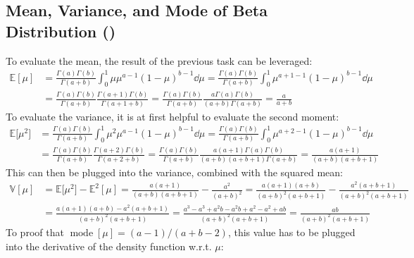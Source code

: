 \documentclass[11pt, a4paper]{scrartcl}
\newcommand{\E}{\mathbb{E}}
\newcommand{\Var}{\mathbb{V}}
\DeclareMathOperator{\mode}{mode}
\newcommand{\diffstar}{\texorpdfstring{\raisebox{-1pt}{\resizebox{!}{8pt}{\(\star\)}}}{*}}
\newcommand{\onestar}  {(\diffstar)}
\begin{document}
		\subsection{Mean, Variance, and Mode of Beta Distribution  \onestar}
			To evaluate the mean, the result of the previous task can be leveraged:
			\begin{align}
				\E[\mu]
					&= \frac{\Gamma(a) \Gamma(b)}{\Gamma(a + b)} \int_{0}^{1}\! \mu \mu^{a - 1} (1 - \mu)^{b - 1} \dd{\mu}
					 = \frac{\Gamma(a) \Gamma(b)}{\Gamma(a + b)} \int_{0}^{1}\! \mu^{a + 1 - 1} (1 - \mu)^{b - 1} \dd{\mu} \\
					&= \frac{\Gamma(a) \Gamma(b)}{\Gamma(a + b)} \frac{\Gamma(a + 1) \Gamma(b)}{\Gamma(a + 1 + b)}
					 = \frac{\Gamma(a) \Gamma(b)}{\Gamma(a + b)} \frac{a \Gamma(a) \Gamma(b)}{(a + b) \Gamma(a + b)}
					 = \frac{a}{a + b}
			\end{align}
			To evaluate the variance, it is at first helpful to evaluate the second moment:
			\begin{align}
				\E\big[\mu^2\big]
					&= \frac{\Gamma(a) \Gamma(b)}{\Gamma(a + b)} \int_{0}^{1}\! \mu^2 \mu^{a - 1} (1 - \mu)^{b - 1} \dd{\mu}
					 = \frac{\Gamma(a) \Gamma(b)}{\Gamma(a + b)} \int_{0}^{1}\! \mu^{a + 2 - 1} (1 - \mu)^{b - 1} \dd{\mu} \\
					&= \frac{\Gamma(a) \Gamma(b)}{\Gamma(a + b)} \frac{\Gamma(a + 2) \Gamma(b)}{\Gamma(a + 2 + b)}
					 = \frac{\Gamma(a) \Gamma(b)}{\Gamma(a + b)} \frac{a (a + 1) \Gamma(a) \Gamma(b)}{(a + b) (a + b + 1) \Gamma(a + b)}
					 = \frac{a (a + 1)}{(a + b) (a + b + 1)}
			\end{align}
			This can then be plugged into the variance, combined with the squared mean:
			\begin{align}
				\Var[\mu]
					&= \E\big[\mu^2\big] - \E^2[\mu]
					 = \frac{a (a + 1)}{(a + b) (a + b + 1)} - \frac{a^2}{(a + b)^2}
					 = \frac{a (a + 1) (a + b)}{(a + b)^2 (a + b + 1)} - \frac{a^2 (a + b + 1)}{(a + b)^2 (a + b + 1)} \\
					&= \frac{a (a + 1) (a + b) - a^2 (a + b + 1)}{(a + b)^2 (a + b + 1)}
					 = \frac{a^3 - a^3 + a^2 b - a^2 b + a^2 - a^2 + ab}{(a + b)^2 (a + b + 1)}
					 = \frac{ab}{(a + b)^2 (a + b + 1)}
			\end{align}
			To proof that \( \mode[\mu] = (a - 1)/(a + b - 2) \), this value has to be plugged into the derivative of the density function w.r.t. \(\mu\):
\end{document}
